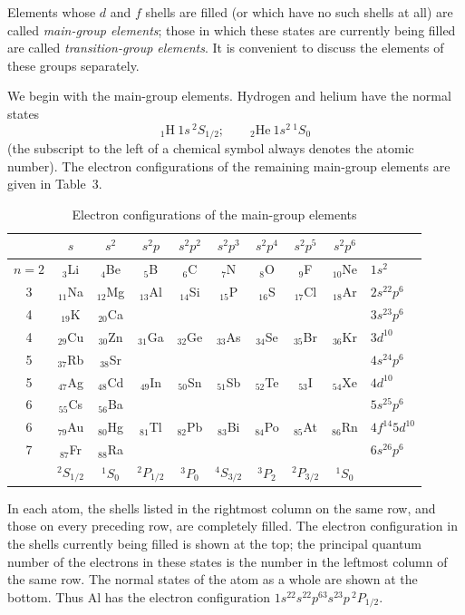 

Elements whose $d$ and $f$ shells are filled (or which have no such shells at all) are called \emph{main-group elements}; those in which these states are currently being filled are called \emph{transition-group elements}. It is convenient to discuss the elements of these groups separately.

We begin with the main-group elements. Hydrogen and helium have the normal states
\[
 {}_1\mathrm H\ 1s\,{}^2S_{1/2};\qquad {}_2\mathrm{He}\ 1s^2\,{}^1S_0
\]
(the subscript to the left of a chemical symbol always denotes the atomic number). The electron configurations of the remaining main-group elements are given in Table~3.

\begin{table}[ht]
\centering\small
\caption{Electron configurations of the main-group elements}
\begin{tabular}{c|cccccccc|l}
&$s$&$s^2$&$s^2p$&$s^2p^2$&$s^2p^3$&$s^2p^4$&$s^2p^5$&$s^2p^6$&\\\hline
$n=2$&$_3$Li&$_4$Be&$_5$B&$_6$C&$_7$N&$_8$O&$_9$F&$_{10}$Ne&$1s^2$\\
3&$_{11}$Na&$_{12}$Mg&$_{13}$Al&$_{14}$Si&$_{15}$P&$_{16}$S&$_{17}$Cl&$_{18}$Ar&$2s^22p^6$\\
4&$_{19}$K&$_{20}$Ca&&&&&&&$3s^23p^6$\\
4&$_{29}$Cu&$_{30}$Zn&$_{31}$Ga&$_{32}$Ge&$_{33}$As&$_{34}$Se&$_{35}$Br&$_{36}$Kr&$3d^{10}$\\
5&$_{37}$Rb&$_{38}$Sr&&&&&&&$4s^24p^6$\\
5&$_{47}$Ag&$_{48}$Cd&$_{49}$In&$_{50}$Sn&$_{51}$Sb&$_{52}$Te&$_{53}$I&$_{54}$Xe&$4d^{10}$\\
6&$_{55}$Cs&$_{56}$Ba&&&&&&&$5s^25p^6$\\
6&$_{79}$Au&$_{80}$Hg&$_{81}$Tl&$_{82}$Pb&$_{83}$Bi&$_{84}$Po&$_{85}$At&$_{86}$Rn&$4f^{14}5d^{10}$\\
7&$_{87}$Fr&$_{88}$Ra&&&&&&&$6s^26p^6$\\\hline
&$^2S_{1/2}$&$^1S_0$&$^2P_{1/2}$&$^3P_0$&$^4S_{3/2}$&$^3P_2$&$^2P_{3/2}$&$^1S_0$&
\end{tabular}
\end{table}

In each atom, the shells listed in the rightmost column on the same row, and those on every preceding row, are completely filled. The electron configuration in the shells currently being filled is shown at the top; the principal quantum number of the electrons in these states is the number in the leftmost column of the same row. The normal states of the atom as a whole are shown at the bottom. Thus Al has the electron configuration $1s^22s^22p^63s^23p\,{}^2P_{1/2}$.

